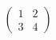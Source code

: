 \documentclass{article}
\begin{document}
\[\begin{pmatrix}1 & 2 \\ 3 & 4\end{pmatrix}\]
\end{document}

